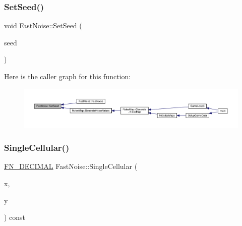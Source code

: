 \subsubsection{\texorpdfstring{Set\+Seed()}{SetSeed()}}
{\footnotesize\ttfamily void Fast\+Noise\+::\+Set\+Seed (\begin{DoxyParamCaption}\item[{int}]{seed }\end{DoxyParamCaption})}

Here is the caller graph for this function\+:
\nopagebreak
\begin{figure}[H]
\begin{center}
\leavevmode
\includegraphics[width=350pt]{class_fast_noise_a2efb595ec8bc18541a3739c6bd9b7567_icgraph}
\end{center}
\end{figure}
\mbox{\label{class_fast_noise_a9729b73152368fb1c494bf4ab7cbe19e}} 
\subsubsection{\texorpdfstring{Single\+Cellular()}{SingleCellular()}\hspace{0.1cm}{\footnotesize\ttfamily [1/2]}}
{\footnotesize\ttfamily \mbox{\hyperlink{_fast_noise_8h_a75a9ef6d2541c4921815b885bfd449c3}{F\+N\+\_\+\+D\+E\+C\+I\+M\+AL}} Fast\+Noise\+::\+Single\+Cellular (\begin{DoxyParamCaption}\item[{\mbox{\hyperlink{_fast_noise_8h_a75a9ef6d2541c4921815b885bfd449c3}{F\+N\+\_\+\+D\+E\+C\+I\+M\+AL}}}]{x,  }\item[{\mbox{\hyperlink{_fast_noise_8h_a75a9ef6d2541c4921815b885bfd449c3}{F\+N\+\_\+\+D\+E\+C\+I\+M\+AL}}}]{y }\end{DoxyParamCaption}) const\hspace{0.3cm}{\ttfamily [private]}}

